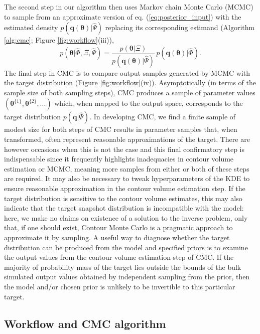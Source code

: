 The second step in our algorithm then uses Markov chain Monte Carlo (MCMC) to sample from an approximate version of eq. (\ref{eq:posterior_input}) with the estimated density $p(\boldsymbol{q}(\boldsymbol{\theta})|\hat{\Psi})$ replacing its corresponding estimand (Algorithm \ref{alg:cmc}; Figure \ref{fig:workflow}(iii)),
%
\begin{equation}\label{eq:posterior_input_estimated}
p(\boldsymbol{\theta}|\hat{\Phi},\Xi,\hat{\Psi}) =
\frac{p(\boldsymbol{\theta}|\Xi)}{p(\boldsymbol{q}(\boldsymbol{\theta})|\hat{\Psi})} \,
p(\boldsymbol{q}(\boldsymbol{\theta})|\hat{\Phi}).
\end{equation}
%
The final step in CMC is to compare output samples generated by MCMC with the target distribution (Figure \ref{fig:workflow}(iv)). Asymptotically (in terms of the sample size of both sampling steps), CMC produces a sample of parameter values $(\boldsymbol{\theta}^{\{1\}},\boldsymbol{\theta}^{\{2\}},...)$ which, when mapped to the output space, corresponds to the target distribution $p(\boldsymbol{q}|\hat{\Psi})$. In developing CMC, we find a finite sample of modest size for both steps of CMC results in parameter samples that, when transformed, often represent reasonable approximations of the target. There are however occasions when this is not the case and this final confirmatory step is indispensable since it frequently highlights inadequacies in contour volume estimation or MCMC, meaning more samples from either or both of these steps are required. It may also be necessary to tweak hyperparameters of the KDE to ensure reasonable approximation in the contour volume estimation step. If the target distribution is sensitive to the contour volume estimates, this may also indicate that the target snapshot distribution is incompatible with the model: here, we make no claims on existence of a solution to the inverse problem, only that, if one should exist, Contour Monte Carlo is a pragmatic approach to approximate it by sampling. A useful way to diagnose whether the target distribution can be produced from the model and specified priors is to examine the output values from the contour volume estimation step of CMC. If the majority of probability mass of the target lies outside the bounds of the bulk simulated output values obtained by independent sampling from the prior, then the model and/or chosen prior is unlikely to be invertible to this particular target.

\subsection{Workflow and CMC algorithm}

